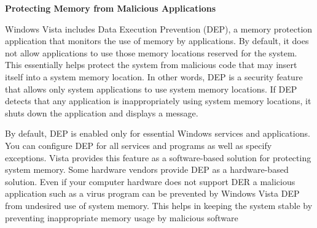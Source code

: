 \documentclass[12pt]{article}
\begin{document}
\begin{adjustwidth}{0.25in}{0.0in}
{\fontsize{18pt}{21.6pt}\selectfont \textbf{Protecting Memory from Malicious Applications}\par}\par

\end{adjustwidth}

\begin{adjustwidth}{0.25in}{0.0in}
{\fontsize{16pt}{19.2pt}\selectfont Windows Vista includes Data Execution Prevention (DEP), a memory protection application that monitors the use of memory by applications. By default, it does not allow applications to use those memory locations reserved for the system. This essentially helps protect the system from malicious code that may insert itself into a system memory location. In other words, DEP is a security feature that allows only system applications to use system memory locations. If DEP detects that any application is inappropriately using system memory locations, it shuts down the application and displays a message.\par}\par

\end{adjustwidth}

\begin{adjustwidth}{0.25in}{0.0in}
{\fontsize{16pt}{19.2pt}\selectfont By default, DEP is enabled only for essential Windows services and applications. You can configure DEP for all services and programs as well as specify exceptions. Vista provides this feature as a software-based solution for protecting system memory. Some hardware vendors provide DEP as a hardware-based solution. Even if your computer hardware does not support DER a malicious application such as a virus program can be prevented by Windows Vista DEP from undesired use of system memory. This helps in keeping the system stable by preventing inappropriate memory usage by malicious software\par}\par

\end{adjustwidth}


\vspace{\baselineskip}

\vspace{\baselineskip}

\vspace{\baselineskip}

\vspace{\baselineskip}
\end{document}
